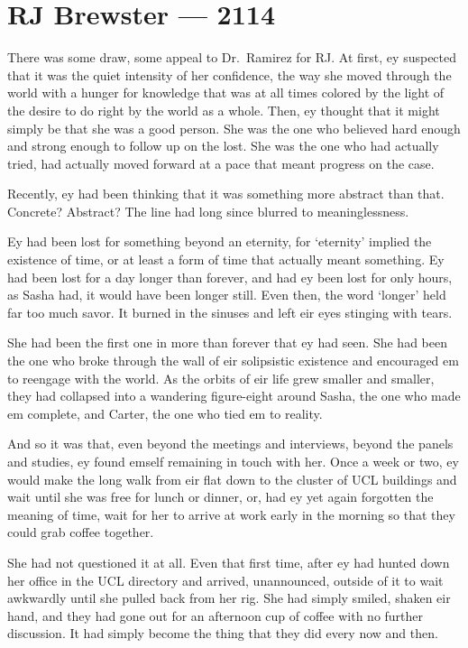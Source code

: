 \hypertarget{rj-brewster-2114}{%
\chapter{RJ Brewster — 2114}\label{rj-brewster-2114}}

There was some draw, some appeal to Dr.~Ramirez for RJ. At first, ey suspected that it was the quiet intensity of her confidence, the way she moved through the world with a hunger for knowledge that was at all times colored by the light of the desire to do right by the world as a whole. Then, ey thought that it might simply be that she was a good person. She was the one who believed hard enough and strong enough to follow up on the lost. She was the one who had actually tried, had actually moved forward at a pace that meant progress on the case.

Recently, ey had been thinking that it was something more abstract than that. Concrete? Abstract? The line had long since blurred to meaninglessness.

Ey had been lost for something beyond an eternity, for `eternity' implied the existence of time, or at least a form of time that actually meant something. Ey had been lost for a day longer than forever, and had ey been lost for only hours, as Sasha had, it would have been longer still. Even then, the word `longer' held far too much savor. It burned in the sinuses and left eir eyes stinging with tears.

She had been the first one in more than forever that ey had seen. She had been the one who broke through the wall of eir solipsistic existence and encouraged em to reengage with the world. As the orbits of eir life grew smaller and smaller, they had collapsed into a wandering figure-eight around Sasha, the one who made em complete, and Carter, the one who tied em to reality.

And so it was that, even beyond the meetings and interviews, beyond the panels and studies, ey found emself remaining in touch with her. Once a week or two, ey would make the long walk from eir flat down to the cluster of UCL buildings and wait until she was free for lunch or dinner, or, had ey yet again forgotten the meaning of time, wait for her to arrive at work early in the morning so that they could grab coffee together.

She had not questioned it at all. Even that first time, after ey had hunted down her office in the UCL directory and arrived, unannounced, outside of it to wait awkwardly until she pulled back from her rig. She had simply smiled, shaken eir hand, and they had gone out for an afternoon cup of coffee with no further discussion. It had simply become the thing that they did every now and then.

